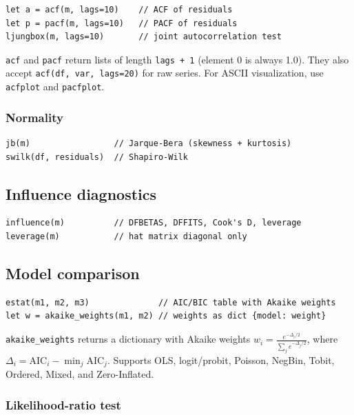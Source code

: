 \begin{lstlisting}
let a = acf(m, lags=10)    // ACF of residuals
let p = pacf(m, lags=10)   // PACF of residuals
ljungbox(m, lags=10)       // joint autocorrelation test
\end{lstlisting}

\texttt{acf} and \texttt{pacf} return lists of length \texttt{lags + 1}
(element 0 is always 1.0). They also accept \texttt{acf(df, var, lags=20)}
for raw series. For ASCII visualization, use \texttt{acfplot} and
\texttt{pacfplot}.

\subsubsection*{Normality}

\begin{lstlisting}
jb(m)                 // Jarque-Bera (skewness + kurtosis)
swilk(df, residuals)  // Shapiro-Wilk
\end{lstlisting}

\subsection{Influence diagnostics}

\begin{lstlisting}
influence(m)          // DFBETAS, DFFITS, Cook's D, leverage
leverage(m)           // hat matrix diagonal only
\end{lstlisting}

\subsection{Model comparison}

\begin{lstlisting}
estat(m1, m2, m3)              // AIC/BIC table with Akaike weights
let w = akaike_weights(m1, m2) // weights as dict {model: weight}
\end{lstlisting}

\texttt{akaike\_weights} returns a dictionary with Akaike weights
$w_i = \frac{e^{-\Delta_i/2}}{\sum_j e^{-\Delta_j/2}}$, where $\Delta_i =
\mathrm{AIC}_i - \min_j \mathrm{AIC}_j$. Supports OLS, logit/probit, Poisson,
NegBin, Tobit, Ordered, Mixed, and Zero-Inflated.

\subsubsection*{Likelihood-ratio test}

